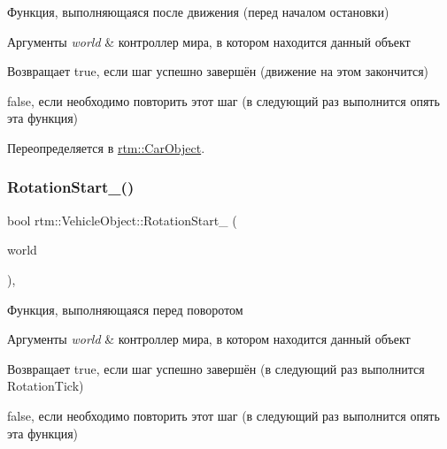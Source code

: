 Функция, выполняющаяся после движения (перед началом остановки) 
\begin{DoxyParams}{Аргументы}
{\em world} & контроллер мира, в котором находится данный объект \\
\hline
\end{DoxyParams}
\begin{DoxyReturn}{Возвращает}
true, если шаг успешно завершён (движение на этом закончится) 

false, если необходимо повторить этот шаг (в следующий раз выполнится опять эта функция) 
\end{DoxyReturn}


Переопределяется в \hyperlink{classrtm_1_1_car_object_a24354013f953386699bbb3f4464adb0c}{rtm\+::\+Car\+Object}.

\mbox{\label{classrtm_1_1_vehicle_object_a2c449bdf4d8e954fe7bd06de4b64deb7}} 
\subsubsection{\texorpdfstring{Rotation\+Start\+\_\+()}{RotationStart\_()}}
{\footnotesize\ttfamily bool rtm\+::\+Vehicle\+Object\+::\+Rotation\+Start\+\_\+ (\begin{DoxyParamCaption}\item[{\hyperlink{classrtm_1_1_world_controller}{World\+Controller} $\ast$const}]{world }\end{DoxyParamCaption})\hspace{0.3cm}{\ttfamily [protected]}, {\ttfamily [virtual]}}

Функция, выполняющаяся перед поворотом 
\begin{DoxyParams}{Аргументы}
{\em world} & контроллер мира, в котором находится данный объект \\
\hline
\end{DoxyParams}
\begin{DoxyReturn}{Возвращает}
true, если шаг успешно завершён (в следующий раз выполнится Rotation\+Tick) 

false, если необходимо повторить этот шаг (в следующий раз выполнится опять эта функция) 
\end{DoxyReturn}
\mbox{\label{classrtm_1_1_vehicle_object_a3dd8736f34c5e5ba26259335193628e5}} 
